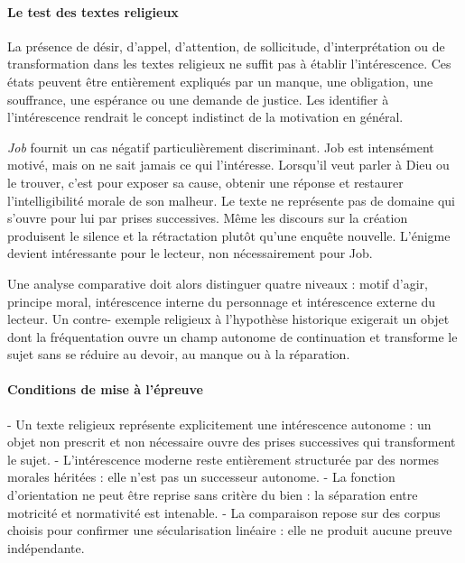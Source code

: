 \documentclass[10pt,a4paper]{article}
\begin{document}
\paragraph{Le test des textes religieux}
La présence de désir, d'appel, d'attention, de sollicitude, d'interprétation ou de transformation dans les textes religieux ne suffit pas à établir l'intérescence. Ces états peuvent être entièrement expliqués par un manque, une obligation, une souffrance, une espérance ou une demande de justice. Les identifier à l'intérescence rendrait le concept indistinct de la motivation en général.

\emph{Job} fournit un cas négatif particulièrement discriminant. Job est intensément motivé, mais on ne sait jamais ce qui l'intéresse. Lorsqu'il veut parler à Dieu ou le trouver, c'est pour exposer sa cause, obtenir une réponse et restaurer l'intelligibilité morale de son malheur. Le texte ne représente pas de domaine qui s'ouvre pour lui par prises successives. Même les discours sur la création produisent le silence et la rétractation plutôt qu'une enquête nouvelle. L'énigme devient intéressante pour le lecteur, non nécessairement pour Job.

Une analyse comparative doit alors distinguer quatre niveaux : motif d'agir, principe moral, intérescence interne du personnage et intérescence externe du lecteur. Un contre- exemple religieux à l'hypothèse historique exigerait un objet dont la fréquentation ouvre un champ autonome de continuation et transforme le sujet sans se réduire au devoir, au manque ou à la réparation.

\paragraph{Conditions de mise à l'épreuve}
- Un texte religieux représente explicitement une intérescence autonome : un objet   non prescrit et non nécessaire ouvre des prises successives qui transforment le sujet. - L'intérescence moderne reste entièrement structurée par des normes morales héritées :   elle n'est pas un successeur autonome. - La fonction d'orientation ne peut être reprise sans critère du bien : la séparation   entre motricité et normativité est intenable. - La comparaison repose sur des corpus choisis pour confirmer une sécularisation   linéaire : elle ne produit aucune preuve indépendante.
\end{document}
